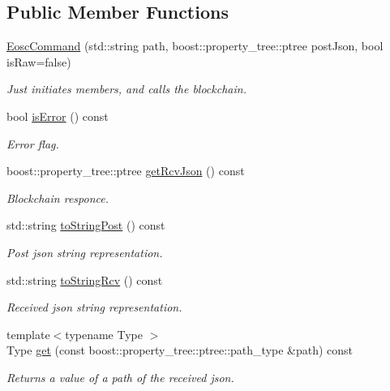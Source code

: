 \subsection*{Public Member Functions}
\begin{DoxyCompactItemize}
\item 
\hyperlink{classtokenika_1_1eosc_1_1_eosc_command_ab736f0dcd8ca14eb0daf9b2244218397}{Eosc\+Command} (std\+::string path, boost\+::property\+\_\+tree\+::ptree post\+Json, bool is\+Raw=false)
\begin{DoxyCompactList}\small\item\em Just initiates members, and calls the blockchain. \end{DoxyCompactList}\item 
bool \hyperlink{classtokenika_1_1eosc_1_1_eosc_command_a63f3adace3f84b59f64c5a54ca0c18dc}{is\+Error} () const
\begin{DoxyCompactList}\small\item\em Error flag. \end{DoxyCompactList}\item 
boost\+::property\+\_\+tree\+::ptree \hyperlink{classtokenika_1_1eosc_1_1_eosc_command_a2b451aefc95258d481cff16747fa1888}{get\+Rcv\+Json} () const
\begin{DoxyCompactList}\small\item\em Blockchain responce. \end{DoxyCompactList}\item 
std\+::string \hyperlink{classtokenika_1_1eosc_1_1_eosc_command_a1cb0362dceb5999e7e06078223b20d91}{to\+String\+Post} () const
\begin{DoxyCompactList}\small\item\em Post json string representation. \end{DoxyCompactList}\item 
std\+::string \hyperlink{classtokenika_1_1eosc_1_1_eosc_command_ad01ef46444d9d8bc708b5d18605c3903}{to\+String\+Rcv} () const
\begin{DoxyCompactList}\small\item\em Received json string representation. \end{DoxyCompactList}\item 
{\footnotesize template$<$typename Type $>$ }\\Type \hyperlink{classtokenika_1_1eosc_1_1_eosc_command_aa1da6eb23f52159afa4a15e767cd7d6f}{get} (const boost\+::property\+\_\+tree\+::ptree\+::path\+\_\+type \&path) const
\begin{DoxyCompactList}\small\item\em Returns a value of a path of the received json. \end{DoxyCompactList}\end{DoxyCompactItemize}

